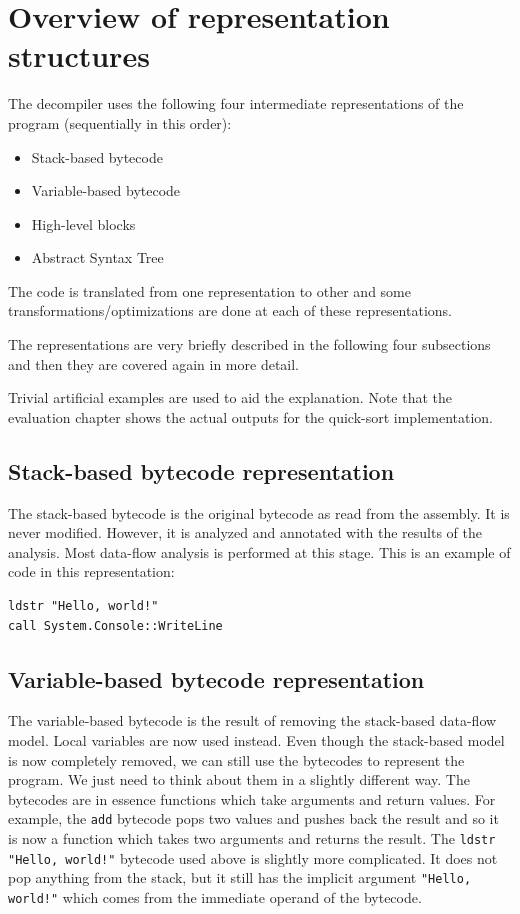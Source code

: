 \documentclass[12pt,twoside,notitlepage]{report}
\begin{document}
\section{Overview of representation structures}

The decompiler uses the following four intermediate representations
of the program (sequentially in this order):
\begin{itemize}
\item Stack-based bytecode
\item Variable-based bytecode
\item High-level blocks
\item Abstract Syntax Tree
\end{itemize}
The code is translated from one representation to other and some
transformations/optimizations are done at each of these representations.

The representations are very briefly described in the following
four subsections and then they are covered again in more detail.

Trivial artificial examples are used to aid the explanation.
Note that the evaluation chapter shows the actual outputs
for the quick-sort implementation.

\subsection{Stack-based bytecode representation}
The stack-based bytecode is the original bytecode as read from the
assembly.  It is never modified.  However, it is analyzed and
annotated with the results of the analysis.  Most data-flow
analysis is performed at this stage.
This is an example of code in this representation:
\begin{verbatim}
ldstr "Hello, world!"
call System.Console::WriteLine
\end{verbatim}

\subsection{Variable-based bytecode representation}
The variable-based bytecode is the result of removing the
stack-based data-flow model.  Local variables are now used instead.
Even though the stack-based model is now completely removed,
we can still use the bytecodes to represent the program.
We just need to think about them in a slightly different way.
The bytecodes are in essence functions which take arguments
and return values.  For example, the \verb|add| bytecode
pops two values and pushes back the result and so it is now
a function which takes two arguments and returns the result.
The \verb|ldstr "Hello, world!"| bytecode used above is slightly
more complicated.  It does not pop anything from the stack,
but it still has the implicit argument \verb|"Hello, world!"|
which comes from the immediate operand of the bytecode.
\end{document}
